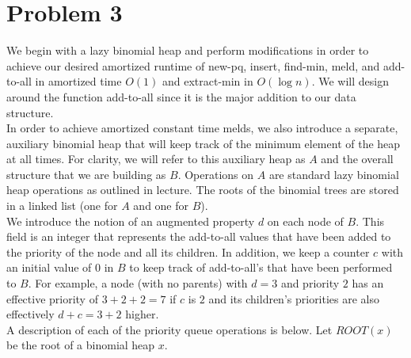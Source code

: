 \documentclass{article}
\theoremstyle{casestyle}
\begin{document}


\newpage


\section *{Problem 3}

We begin with a lazy binomial heap and perform modifications in order to achieve our desired  amortized runtime of new-pq, insert, find-min, meld, and add-to-all in amortized time $O(1)$ and extract-min in $O(\log n)$. We will design around the function add-to-all since it is the major addition to our data structure.\\

In order to achieve amortized constant time melds, we also introduce a separate, auxiliary binomial heap that will keep track of the minimum element of the heap at all times. For clarity, we will refer to this auxiliary heap as $A$ and the overall structure that we are building as $B$. Operations on $A$ are standard lazy binomial heap operations as outlined in lecture. The roots of the binomial trees are stored in a linked list (one for $A$ and one for $B$).
\\

We introduce the notion of an augmented property $d$ on each node of $B$. This field is an integer that represents the add-to-all values that have been added to the priority of the node and all its children. In addition, we keep a counter $c$ with an initial value of 0 in $B$ to keep track of add-to-all's that have been performed to $B$. For example, a node (with no parents) with $d=3$ and priority $2$ has an effective priority of $3+2+2=7$ if $c$ is $2$ and its children's priorities are also effectively $d+c=3+2$ higher. \\

A description of each of the priority queue operations is below. Let $ROOT(x)$ be the root of a binomial heap $x$. \\
\end{document}
